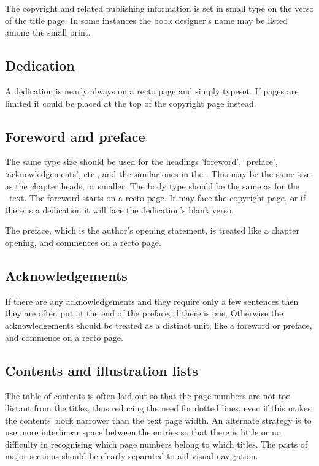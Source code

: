 \documentclass[10pt,letterpaper,extrafontsizes]{memoir}
\begin{document}
    The copyright and related publishing 
information is set in small type
on the verso of the title page. In some instances the book designer's name may
be listed among the small print.

\subsection{Dedication}

    A dedication is nearly always on a recto page and 
simply typeset. If 
pages are limited it could be placed at the top of the copyright 
page instead.

\subsection{Foreword and preface}

    The same type size should be used for the headings 'foreword', `preface',
`acknowledgements', etc., and the similar ones in the \pixbackmatter. This
may be the same size as the chapter heads, or smaller. The body type should be
the same as for the \pixmainmatter\ text.
The foreword starts on a recto page. It may face the 
copyright page, or if 
there is a dedication it will face the dedication's 
blank verso.

    The preface, which is the author's opening statement, 
is treated like a chapter opening, and commences on a recto page.

\subsection{Acknowledgements}

    If there are any acknowledgements and they 
require only a few sentences then they are often put at the end of the 
preface, if there is one. Otherwise the acknowledgements
should be treated as a distinct unit, like a foreword or preface, and commence
on a recto page.

\subsection{Contents and illustration lists}

    The table of contents is often laid out so 
that the page numbers
are not too distant from the titles, thus reducing the need for dotted lines,
even if this makes the contents block narrower than the text page width. 
An alternate strategy is to use more interlinear space between the entries
so that there is little or no difficulty in recognising which page
numbers belong to which titles. The parts of major sections should be
clearly separated to aid visual navigation.
\end{document}
